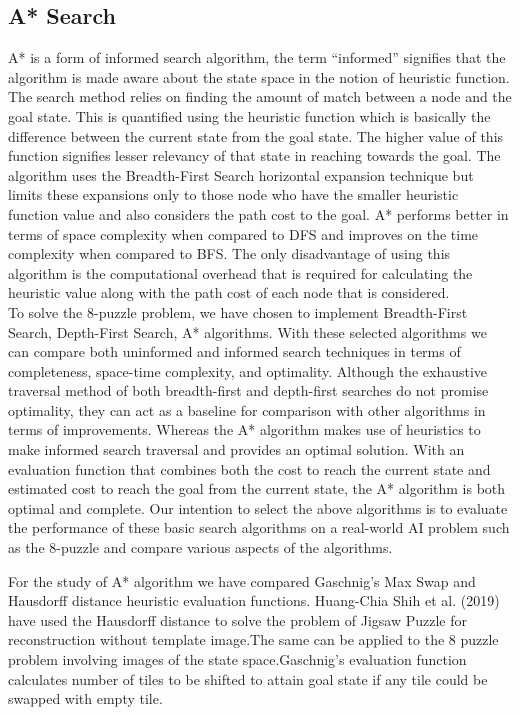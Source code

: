 \documentclass{svproc}
\begin{document}
\subsection{A* Search }
\noindent A* is a form of informed search algorithm, the term “informed” signifies that the algorithm is made aware about the state space in the notion of heuristic function. The search method relies on finding the amount of match between a node and the goal state. This is quantified using the heuristic function which is basically the difference between the current state from the goal state. The higher value of this function signifies lesser relevancy of that state in reaching towards the goal. The algorithm uses the Breadth-First Search horizontal expansion technique but limits these expansions only to those node who have the smaller heuristic function value and also considers the path cost to the goal. A* performs better in terms of space complexity when compared to DFS  and  improves on the time complexity  when compared to BFS. The only disadvantage of using this algorithm is the computational overhead that is required for calculating the heuristic value along with the path cost of each node that is considered. \\

\noindent To solve the 8-puzzle problem, we have chosen to implement Breadth-First Search, Depth-First Search, A* algorithms. With these selected algorithms we can compare both uninformed and informed search techniques in terms of completeness, space-time complexity, and optimality. Although the exhaustive traversal method of both breadth-first and depth-first searches do not promise optimality, they can act as a baseline for comparison with other algorithms in terms of improvements. Whereas the A* algorithm makes use of heuristics to make informed search traversal and provides an optimal solution. With an evaluation function that combines both the cost to reach the current state and estimated cost to reach the goal from the current state, the A* algorithm is both optimal and complete. Our intention to select the above algorithms is to evaluate the performance of these basic search algorithms on a real-world AI problem such as the 8-puzzle and compare various aspects of the algorithms.

\noindent For the study of A* algorithm we have compared Gaschnig’s Max Swap and Hausdorff distance heuristic evaluation functions. Huang-Chia Shih et al. (2019) have used the Hausdorff distance to solve the problem of Jigsaw Puzzle for reconstruction without template image.The same can be applied to the 8 puzzle problem involving images of the state space.Gaschnig's evaluation function calculates number of tiles to be shifted to attain goal state if any tile could be swapped with empty tile.
\end{document}
